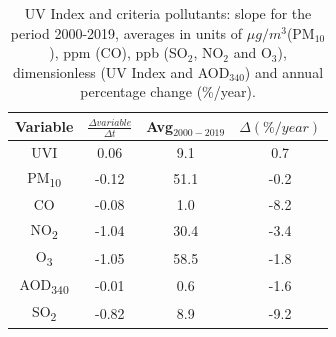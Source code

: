 \documentclass[10pt]{article}
\begin{document}
\begin{table}[H]
\centering
\begin{tabular}{cccc} \hline
Variable &$\frac{\Delta variable}{\Delta t}$ & Avg$_{2000-2019}$ & $\Delta(\%/year)$\\ \hline
UVI &0.06 &9.1 &0.7 \\
PM\textsubscript{10} &-0.12 & 51.1& -0.2\\ 
CO &-0.08 &1.0 &-8.2\\ 
NO\textsubscript{2} &-1.04 & 30.4 &-3.4\\ 
O\textsubscript{3} &-1.05 & 58.5 &-1.8\\ 
AOD\textsubscript{340} &-0.01 &0.6 &-1.6\\
SO\textsubscript{2} & -0.82 &8.9 & -9.2\\
\hline
\end{tabular}
\caption{{{{UV Index and criteria pollutants: slope for the period 2000-2019, averages in units of $\mu g/m^3$(PM$_{10}$), ppm (CO), ppb (SO$_2$, NO$_2$ and O$_3$), dimensionless (UV Index and AOD$_{340}$) and annual percentage change (\%/year).}}}}
\label{table:uvindex}
\end{table}
\end{document}
